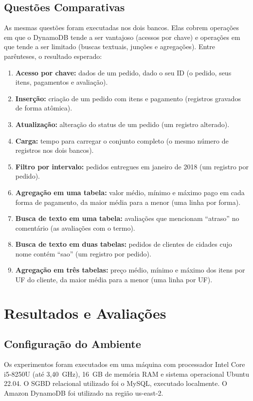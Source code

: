\documentclass[12pt]{article}
\begin{document}
\subsection{Questões Comparativas}

As mesmas questões foram executadas nos dois bancos. Elas cobrem operações em
que o DynamoDB tende a ser vantajoso (acessos por chave) e operações em que
tende a ser limitado (buscas textuais, junções e agregações). Entre
parênteses, o resultado esperado:

\begin{enumerate}
  \setlength{\itemsep}{0pt}
  \item \textbf{Acesso por chave:} dados de um pedido, dado o seu ID (o
  pedido, seus itens, pagamentos e avaliação).
  \item \textbf{Inserção:} criação de um pedido com itens e pagamento
  (registros gravados de forma atômica).
  \item \textbf{Atualização:} alteração do status de um pedido (um registro
  alterado).
  \item \textbf{Carga:} tempo para carregar o conjunto completo (o mesmo
  número de registros nos dois bancos).
  \item \textbf{Filtro por intervalo:} pedidos entregues em janeiro de 2018
  (um registro por pedido).
  \item \textbf{Agregação em uma tabela:} valor médio, mínimo e máximo pago em
  cada forma de pagamento, da maior média para a menor (uma linha por forma).
  \item \textbf{Busca de texto em uma tabela:} avaliações que mencionam
  ``atraso'' no comentário (as avaliações com o termo).
  \item \textbf{Busca de texto em duas tabelas:} pedidos de clientes de
  cidades cujo nome contém ``sao'' (um registro por pedido).
  \item \textbf{Agregação em três tabelas:} preço médio, mínimo e máximo dos
  itens por UF do cliente, da maior média para a menor (uma linha por UF).
\end{enumerate}

\section{Resultados e Avaliações}
\subsection{Configuração do Ambiente}
Os experimentos foram executados em uma máquina com processador Intel Core i5-8250U (até 3,40~GHz), 16~GB de memória RAM
e sistema operacional Ubuntu 22.04. O SGBD relacional
utilizado foi o MySQL, executado localmente. O Amazon DynamoDB foi utilizado na região us-east-2.
\end{document}

